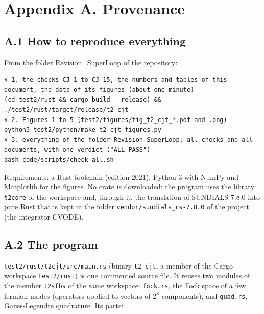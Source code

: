 \documentclass[
  10pt,
]{article}
\begin{document}
\hypertarget{appendix-a.-provenance}{%
\section{Appendix A. Provenance}\label{appendix-a.-provenance}}

\hypertarget{a.1-how-to-reproduce-everything}{%
\subsection{A.1 How to reproduce
everything}\label{a.1-how-to-reproduce-everything}}

From the folder Revision\_SuperLoop of the repository:

\begin{verbatim}
# 1. the checks CJ-1 to CJ-15, the numbers and tables of this document, the data of its figures (about one minute)
(cd test2/rust && cargo build --release) && ./test2/rust/target/release/t2_cjt
# 2. Figures 1 to 5 (test2/figures/fig_t2_cjt_*.pdf and .png)
python3 test2/python/make_t2_cjt_figures.py
# 3. everything of the folder Revision_SuperLoop, all checks and all documents, with one verdict ("ALL PASS")
bash code/scripts/check_all.sh
\end{verbatim}

Requirements: a Rust toolchain (edition 2021); Python 3 with NumPy and
Matplotlib for the figures. No crate is downloaded: the program uses the
library \texttt{t2core} of the workspace and, through it, the
translation of SUNDIALS 7.8.0 into pure Rust that is kept in the folder
\texttt{vendor/sundials\_rs-7.8.0} of the project (the integrator
CVODE).

\hypertarget{a.2-the-program}{%
\subsection{A.2 The program}\label{a.2-the-program}}

\texttt{test2/rust/t2cjt/src/main.rs} (binary \texttt{t2\_cjt}, a member
of the Cargo workspace \texttt{test2/rust}) is one commented source
file. It reuses two modules of the member \texttt{t2sfbs} of the same
workspace: \texttt{fock.rs}, the Fock space of a few fermion modes
(operators applied to vectors of \(2^8\) components), and
\texttt{quad.rs}, Gauss-Legendre quadrature. Its parts:
\end{document}
